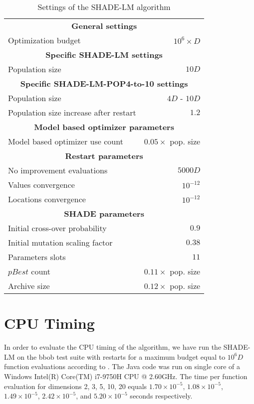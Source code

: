 \documentclass[sigconf]{acmart}
\begin{document}
\begin{table}[!ht]
	\caption{Settings of the SHADE-LM algorithm
	\label{tab:algorithm-settings}}
	\begin{center}
	\begin{tabular}{lr}
		\multicolumn{2}{c}{\textbf{General settings}} \\
		Optimization budget & $10^6 \times D$ \\
		\multicolumn{2}{c}{\textbf{Specific SHADE-LM settings}} \\
		Population size & $10D$ \\
		\multicolumn{2}{c}{\textbf{Specific SHADE-LM-POP4-to-10 settings}} \\
		Population size & $4D$ - $10D$ \\
		Population size increase after restart & $1.2$ \\
		\multicolumn{2}{c}{\textbf{Model based optimizer parameters}} \\
		Model based optimizer use count & $0.05 \times$ pop. size \\
		\multicolumn{2}{c}{\textbf{Restart parameters}} \\
    No improvement evaluations & $5000D$ \\
    Values convergence & $10^{-12}$ \\
    Locations convergence & $10^{-12}$ \\
		\multicolumn{2}{c}{\textbf{SHADE parameters}} \\
		Initial cross-over probability & $0.9$ \\
		Initial mutation scaling factor & $0.38$ \\
    Parameters slots & $11$ \\
    $pBest$ count & $0.11 \times$ pop. size \\
    Archive size & $0.12 \times$ pop. size \\
	\end{tabular}
\end{center}
\end{table}


%
\section{CPU Timing}
In order to evaluate the CPU timing of the algorithm, we have run the {SHADE-LM}
on the {bbob test suite \cite{hansen2010fun}} with restarts for a maximum budget
equal to {$10^6D$} function evaluations according to \cite{hansen2016exp}.
The {Java} code was run on  single core of a {Windows Intel(R) Core(TM) i7-9750H CPU @ 2.60GHz}.
The time per function evaluation for dimensions 2, 3, 5, 10, 20 equals
$1.70\times10^{-5}$,
{$1.08\times10^{-5}$},
{$1.49\times10^{-5}$},
{$2.42\times10^{-5}$},
and {$5.20\times10^{-5}$}
seconds respectively. 
\end{document}

